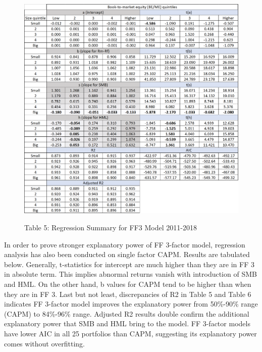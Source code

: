 \documentclass[12pt]{article}
\begin{document}
\begin{figure}[h]
	\centering
	\caption*{Table 5: Regression Summary for FF3 Model 2011-2018}
	\includegraphics[width=1\linewidth]{A5.png}
	\label{fig:label}
\end{figure}


\noindent In order to prove stronger explanatory power of FF 3-factor model, regression analysis has also been conducted on single factor CAPM. Results are tabulated below. Generally, t-statistics for intercept are much higher than they are in FF 3 in absolute term. This implies abnormal returns vanish with introduction of SMB and HML. On the other hand, b values for CAPM tend to be higher than when they are in FF 3. Last but not least, discrepancies of R2 in Table 5 and Table 6 indicates FF 3-factor model improves the explanatory power from 50\%-90\% range (CAPM) to 84\%-96\% range. Adjusted R2 results double confirm the additional explanatory power that SMB and HML bring to the model. FF 3-factor models have lower AIC in all 25 portfolios than CAPM, suggesting its explanatory power comes without overfitting.
\end{document}
